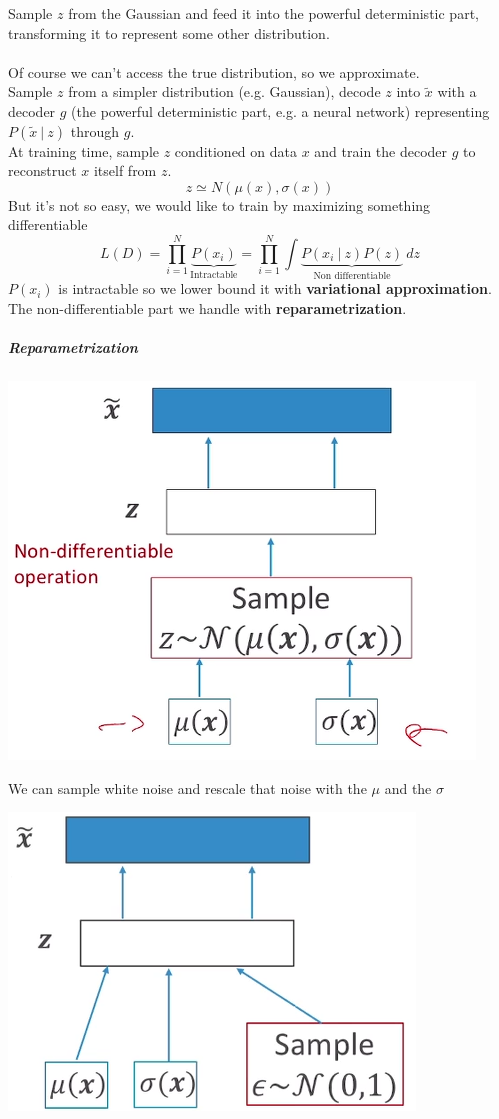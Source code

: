 \documentclass[10pt]{report}
\begin{document}
Sample $z$ from the Gaussian and feed it into the powerful deterministic part, transforming it to represent some other distribution.\\\\
Of course we can't access the true distribution, so we approximate.\\
Sample $z$ from a simpler distribution (e.g. Gaussian), decode $z$ into $\tilde{x}$ with a decoder $g$ (the powerful deterministic part, e.g. a neural network) representing $P(\tilde{x}\:|\:z)$ through $g$.\\
At training time, sample $z$ conditioned on data $x$ and train the decoder $g$ to reconstruct $x$ itself from $z$.
$$z\simeq N(\mu(x),\sigma(x))$$
But it's not so easy, we would like to train by maximizing something differentiable
$$L(D)=\prod_{i=1}^N\underset{\text{Intractable}}{\underbrace{P(x_i)}}=\prod_{i=1}^N\int \underset{\text{Non differentiable}}{\underbrace{P(x_i\:|\:z)P(z)}}\:dz$$
$P(x_i)$ is intractable so we lower bound it with \textbf{variational approximation}.\\
The non-differentiable part we handle with \textbf{reparametrization}.
\subparagraph{Reparametrization} \begin{center}
	\includegraphics[scale=0.5]{142.png}
\end{center}
We can sample white noise and rescale that noise with the $\mu$ and the $\sigma$
\begin{center}
	\includegraphics[scale=0.5]{143.png}
\end{center}
\end{document}
